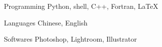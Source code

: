 


\begin{cvskills}


\cvskill
{Programming} %
{Python, shell, C++, Fortran, LaTeX} %



\cvskill
{Languages} %
{Chinese, English} %



\cvskill
{Softwares} %
{Photoshop, Lightroom, Illustrator} %


\end{cvskills}